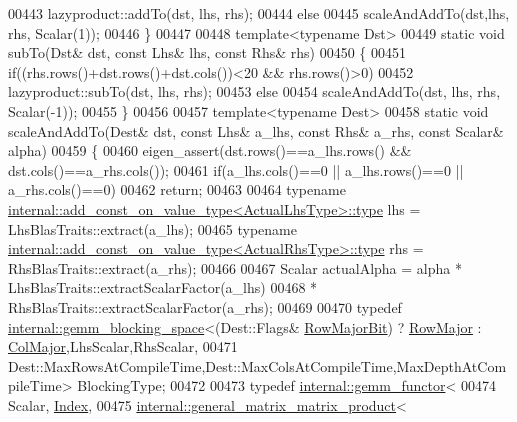 \begin{DoxyCode}
00443       lazyproduct::addTo(dst, lhs, rhs);
00444     \textcolor{keywordflow}{else}
00445       scaleAndAddTo(dst,lhs, rhs, Scalar(1));
00446   \}
00447 
00448   \textcolor{keyword}{template}<\textcolor{keyword}{typename} Dst>
00449   \textcolor{keyword}{static} \textcolor{keywordtype}{void} subTo(Dst& dst, \textcolor{keyword}{const} Lhs& lhs, \textcolor{keyword}{const} Rhs& rhs)
00450   \{
00451     \textcolor{keywordflow}{if}((rhs.rows()+dst.rows()+dst.cols())<20 && rhs.rows()>0)
00452       lazyproduct::subTo(dst, lhs, rhs);
00453     \textcolor{keywordflow}{else}
00454       scaleAndAddTo(dst, lhs, rhs, Scalar(-1));
00455   \}
00456 
00457   \textcolor{keyword}{template}<\textcolor{keyword}{typename} Dest>
00458   \textcolor{keyword}{static} \textcolor{keywordtype}{void} scaleAndAddTo(Dest& dst, \textcolor{keyword}{const} Lhs& a\_lhs, \textcolor{keyword}{const} Rhs& a\_rhs, \textcolor{keyword}{const} Scalar& alpha)
00459   \{
00460     eigen\_assert(dst.rows()==a\_lhs.rows() && dst.cols()==a\_rhs.cols());
00461     \textcolor{keywordflow}{if}(a\_lhs.cols()==0 || a\_lhs.rows()==0 || a\_rhs.cols()==0)
00462       \textcolor{keywordflow}{return};
00463 
00464     \textcolor{keyword}{typename} \hyperlink{group___sparse_core___module}{internal::add\_const\_on\_value\_type<ActualLhsType>::type}
       lhs = LhsBlasTraits::extract(a\_lhs);
00465     \textcolor{keyword}{typename} \hyperlink{group___sparse_core___module}{internal::add\_const\_on\_value\_type<ActualRhsType>::type}
       rhs = RhsBlasTraits::extract(a\_rhs);
00466 
00467     Scalar actualAlpha = alpha * LhsBlasTraits::extractScalarFactor(a\_lhs)
00468                                * RhsBlasTraits::extractScalarFactor(a\_rhs);
00469 
00470     \textcolor{keyword}{typedef} \hyperlink{class_eigen_1_1internal_1_1gemm__blocking__space}{internal::gemm\_blocking\_space}<(Dest::Flags&
      \hyperlink{group__flags_gae4f56c2a60bbe4bd2e44c5b19cbe8762}{RowMajorBit}) ? \hyperlink{group__enums_ggaacded1a18ae58b0f554751f6cdf9eb13acfcde9cd8677c5f7caf6bd603666aae3}{RowMajor} : \hyperlink{group__enums_ggaacded1a18ae58b0f554751f6cdf9eb13a0cbd4bdd0abcfc0224c5fcb5e4f6669a}{ColMajor},LhsScalar,RhsScalar,
00471             Dest::MaxRowsAtCompileTime,Dest::MaxColsAtCompileTime,MaxDepthAtCompileTime> BlockingType;
00472 
00473     \textcolor{keyword}{typedef} \hyperlink{struct_eigen_1_1internal_1_1gemm__functor}{internal::gemm\_functor}<
00474       Scalar, \hyperlink{namespace_eigen_a62e77e0933482dafde8fe197d9a2cfde}{Index},
00475       \hyperlink{struct_eigen_1_1internal_1_1general__matrix__matrix__product}{internal::general\_matrix\_matrix\_product}<

\end{DoxyCode}
